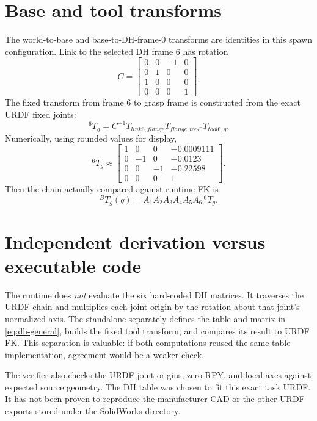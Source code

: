 \section{Base and tool transforms}
The world-to-base and base-to-DH-frame-0 transforms are identities in this
spawn configuration. Link  to the selected DH frame 6 has
rotation
\begin{equation}
 C=\begin{bmatrix}0&0&-1&0\\0&1&0&0\\1&0&0&0\\0&0&0&1\end{bmatrix}.
\end{equation}
The fixed transform from frame 6 to grasp frame is constructed from the exact
URDF fixed joints:
\begin{equation}
 {}^6T_g=C^{-1}T_{link6,flange}T_{flange,tool0}T_{tool0,g}.
 \label{eq:dh-tool-transform}
\end{equation}
Numerically, using rounded values for display,
\begin{equation}
 {}^6T_g\approx\begin{bmatrix}
 1&0&0&-0.0009111\\0&-1&0&-0.0123\\0&0&-1&-0.22598\\0&0&0&1
 \end{bmatrix}.
\end{equation}
Then the chain actually compared against runtime FK is
\begin{equation}
 {}^BT_g(q)=A_1A_2A_3A_4A_5A_6\,{}^6T_g.
 \label{eq:dh-chain}
\end{equation}

\section{Independent derivation versus executable code}
The runtime  does \emph{not} evaluate the six hard-coded
DH matrices. It traverses the URDF chain and multiplies each joint origin by
the rotation about that joint's normalized axis. The standalone
 separately defines the table and matrix in
\cref{eq:dh-general}, builds the fixed tool transform, and compares its result
to URDF FK. This separation is valuable: if both computations reused the same
table implementation, agreement would be a weaker check.

The verifier also checks the URDF joint origins, zero RPY, and local axes
against expected source geometry. The DH table was chosen to fit this exact
task URDF. It has not been proven to reproduce the manufacturer CAD or the
other URDF exports stored under the SolidWorks directory.
